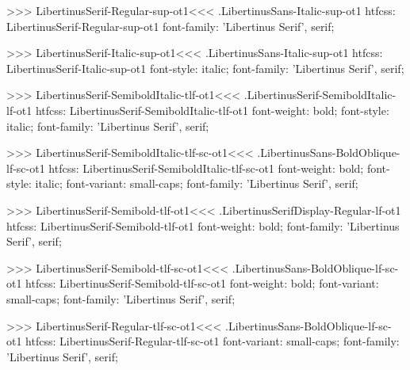 {{{{>>>
\<LibertinusSerif-Regular-sup-ot1\><<<
.LibertinusSans-Italic-sup-ot1
htfcss:  LibertinusSerif-Regular-sup-ot1  font-family: 'Libertinus Serif', serif;

>>>
\<LibertinusSerif-Italic-sup-ot1\><<<
.LibertinusSans-Italic-sup-ot1
htfcss:  LibertinusSerif-Italic-sup-ot1  font-style: italic; font-family: 'Libertinus Serif', serif;

>>>
\<LibertinusSerif-SemiboldItalic-tlf-ot1\><<<
.LibertinusSerif-SemiboldItalic-lf-ot1
htfcss:  LibertinusSerif-SemiboldItalic-tlf-ot1  font-weight: bold; font-style: italic; font-family: 'Libertinus Serif', serif;

>>>
\<LibertinusSerif-SemiboldItalic-tlf-sc-ot1\><<<
.LibertinusSans-BoldOblique-lf-sc-ot1
htfcss:  LibertinusSerif-SemiboldItalic-tlf-sc-ot1  font-weight: bold; font-style: italic; font-variant: small-caps; font-family: 'Libertinus Serif', serif;

>>>
\<LibertinusSerif-Semibold-tlf-ot1\><<<
.LibertinusSerifDisplay-Regular-lf-ot1
htfcss:  LibertinusSerif-Semibold-tlf-ot1  font-weight: bold; font-family: 'Libertinus Serif', serif;

>>>
\<LibertinusSerif-Semibold-tlf-sc-ot1\><<<
.LibertinusSans-BoldOblique-lf-sc-ot1
htfcss:  LibertinusSerif-Semibold-tlf-sc-ot1  font-weight: bold; font-variant: small-caps; font-family: 'Libertinus Serif', serif;

>>>
\<LibertinusSerif-Regular-tlf-sc-ot1\><<<
.LibertinusSans-BoldOblique-lf-sc-ot1
htfcss:  LibertinusSerif-Regular-tlf-sc-ot1  font-variant: small-caps; font-family: 'Libertinus Serif', serif;

}}}}
